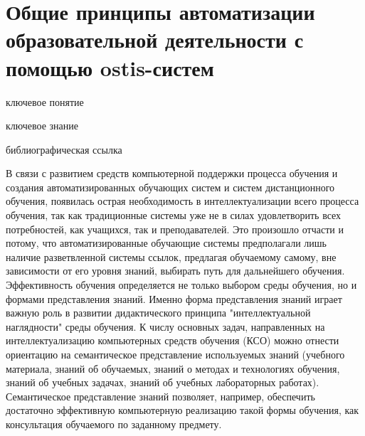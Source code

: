 \section{Общие принципы автоматизации образовательной деятельности с помощью ostis-систем}
\label{sec_general_principles_automation_educational_activities}

\begin{SCn}
	
	\bigskip
	
	\begin{scnrelfromlist}{ключевое понятие}
	\end{scnrelfromlist}
	
	\bigskip
	
	\begin{scnrelfromlist}{ключевое знание}
	\end{scnrelfromlist}
	
	\bigskip
	
	\begin{scnrelfromlist}{библиографическая ссылка}
	\end{scnrelfromlist}
	
\end{SCn}

В связи с развитием средств компьютерной поддержки процесса обучения и создания автоматизированных обучающих систем и систем дистанционного обучения, появилась острая необходимость в интеллектуализации всего процесса обучения, так как традиционные системы уже не в силах удовлетворить всех потребностей, как учащихся, так и преподавателей. Это произошло отчасти и потому, что автоматизированные обучающие системы предполагали лишь наличие разветвленной системы ссылок, предлагая обучаемому самому, вне зависимости от его уровня знаний, выбирать путь для дальнейшего обучения. Эффективность обучения определяется не только выбором среды обучения, но и формами представления знаний. Именно форма представления знаний играет важную роль в развитии дидактического принципа "интеллектуальной наглядности"{} среды обучения. К числу основных задач, направленных на интеллектуализацию компьютерных средств обучения (КСО) можно отнести ориентацию на семантическое представление используемых знаний (учебного материала, знаний об обучаемых, знаний о методах и технологиях обучения, знаний об учебных задачах, знаний об учебных лабораторных работах). Семантическое представление знаний позволяет, например, обеспечить достаточно эффективную компьютерную реализацию такой формы обучения, как консультация обучаемого по заданному предмету.


